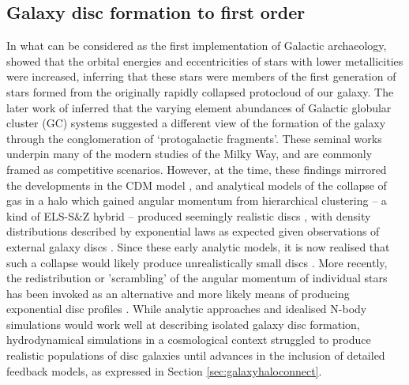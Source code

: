 \subsection{Galaxy disc formation to first order}


In what can be considered as the first implementation of Galactic archaeology, \citet[the ELS model]{1962ApJ...136..748E} showed that the orbital energies and eccentricities of stars with lower metallicities were increased, inferring that these stars were members of the first generation of stars formed from the originally rapidly collapsed protocloud of our galaxy. The later work of \citet[the S\&Z model]{1978ApJ...225..357S} inferred that the varying element abundances of Galactic globular cluster (GC) systems suggested a different view of the formation of the galaxy through the conglomeration of `protogalactic fragments'. These seminal works underpin many of the modern studies of the Milky Way, and are commonly framed as competitive scenarios. However, at the time, these findings mirrored the developments in the CDM model \citep{1978MNRAS.183..341W}, and analytical models of the collapse of gas in a halo which gained angular momentum from hierarchical clustering -- a kind of ELS-S\&Z hybrid -- produced seemingly realistic discs \citep{1980MNRAS.193..189F}, with density distributions described by exponential laws as expected given observations of external galaxy discs \citep[e.g.][]{1959HDP....53..311D,1970ApJ...160..811F,1983MNRAS.202.1025G,2006A&A...454..759P}. Since these early analytic models, it is now realised that such a collapse would likely produce unrealistically small discs \citep[e.g.][]{2000MNRAS.317..697E}. More recently, the redistribution or 'scrambling' of the angular momentum of individual stars has been invoked as an alternative and more likely means of producing exponential disc profiles \citep[e.g.][]{2013ApJ...775L..35E,2016ApJ...830..115E,2016arXiv161203171H}. While analytic approaches and idealised N-body simulations would work well at describing isolated galaxy disc formation, hydrodynamical simulations in a cosmological context struggled to produce realistic populations of disc galaxies until advances in the inclusion of detailed feedback models, as expressed in Section \ref{sec:galaxyhaloconnect}. 

